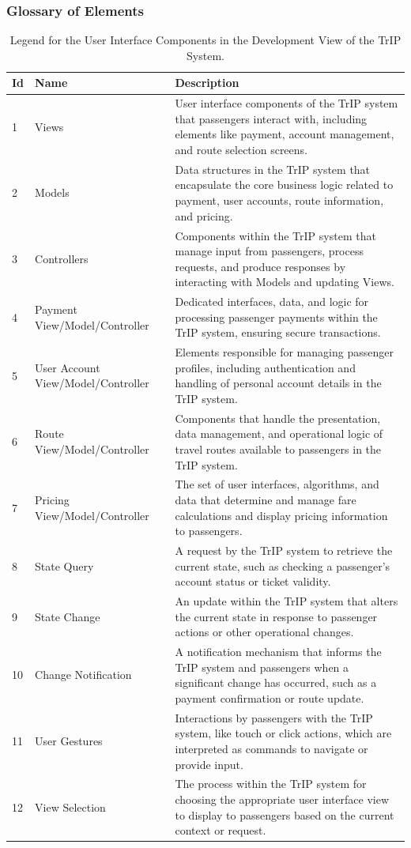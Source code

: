 \subsubsection{Glossary of Elements}

\begin{table}[H]
    \centering
    \caption{Legend for the User Interface Components in the Development View of the TrIP System.}
    \label{tab:trip_system_ui_development_legend}
    \begin{tabular}{@{}llp{10cm}@{}}
    \toprule
    \textbf{Id} & \textbf{Name} & \textbf{Description} \\
    \midrule
    1 & Views & User interface components of the TrIP system that passengers interact with, including elements like payment, account management, and route selection screens. \\
    2 & Models & Data structures in the TrIP system that encapsulate the core business logic related to payment, user accounts, route information, and pricing. \\
    3 & Controllers & Components within the TrIP system that manage input from passengers, process requests, and produce responses by interacting with Models and updating Views. \\
    4 & Payment View/Model/Controller & Dedicated interfaces, data, and logic for processing passenger payments within the TrIP system, ensuring secure transactions. \\
    5 & User Account View/Model/Controller & Elements responsible for managing passenger profiles, including authentication and handling of personal account details in the TrIP system. \\
    6 & Route View/Model/Controller & Components that handle the presentation, data management, and operational logic of travel routes available to passengers in the TrIP system. \\
    7 & Pricing View/Model/Controller & The set of user interfaces, algorithms, and data that determine and manage fare calculations and display pricing information to passengers. \\
    8 & State Query & A request by the TrIP system to retrieve the current state, such as checking a passenger's account status or ticket validity. \\
    9 & State Change & An update within the TrIP system that alters the current state in response to passenger actions or other operational changes. \\
    10 & Change Notification & A notification mechanism that informs the TrIP system and passengers when a significant change has occurred, such as a payment confirmation or route update. \\
    11 & User Gestures & Interactions by passengers with the TrIP system, like touch or click actions, which are interpreted as commands to navigate or provide input. \\
    12 & View Selection & The process within the TrIP system for choosing the appropriate user interface view to display to passengers based on the current context or request. \\
    \bottomrule
    \end{tabular}
\end{table}

